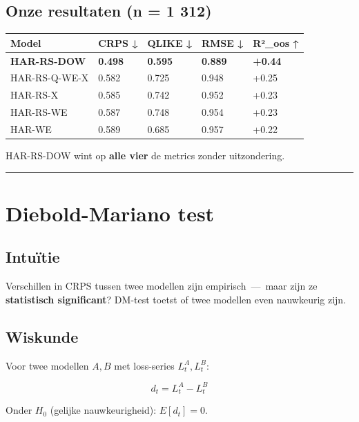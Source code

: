 \hypertarget{onze-resultaten-n-1-312}{%
\subsection{Onze resultaten (n = 1 312)}\label{onze-resultaten-n-1-312}}

\begin{longtable}[]{@{}lllll@{}}
\toprule
Model & CRPS ↓ & QLIKE ↓ & RMSE ↓ & R²\_oos ↑ \\
\midrule
\endhead
\textbf{HAR-RS-DOW} & \textbf{0.498} & \textbf{0.595} & \textbf{0.889} & \textbf{+0.44} \\
HAR-RS-Q-WE-X & 0.582 & 0.725 & 0.948 & +0.25 \\
HAR-RS-X & 0.585 & 0.742 & 0.952 & +0.23 \\
HAR-RS-WE & 0.587 & 0.748 & 0.954 & +0.23 \\
HAR-WE & 0.589 & 0.685 & 0.957 & +0.22 \\
\bottomrule
\end{longtable}

HAR-RS-DOW wint op \textbf{alle vier} de metrics zonder uitzondering.

\begin{center}\rule{0.5\linewidth}{0.5pt}\end{center}

\hypertarget{diebold-mariano-test}{%
\section{Diebold-Mariano test}\label{diebold-mariano-test}}

\hypertarget{intuuxeftie-8}{%
\subsection{Intuïtie}\label{intuuxeftie-8}}

Verschillen in CRPS tussen twee modellen zijn empirisch \,---\, maar zijn ze \textbf{statistisch significant}? DM-test toetst of twee modellen even nauwkeurig zijn.

\hypertarget{wiskunde-2}{%
\subsection{Wiskunde}\label{wiskunde-2}}

Voor twee modellen \(A, B\) met loss-series \(L_t^A, L_t^B\):

\[d_t = L_t^A - L_t^B\]

Onder \(H_0\) (gelijke nauwkeurigheid): \(E[d_t] = 0\).

